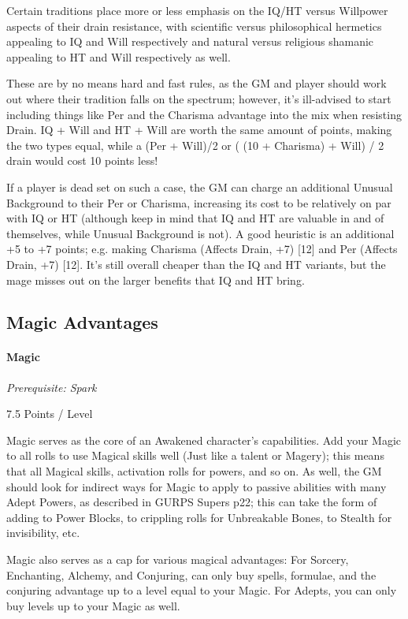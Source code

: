 \begin{multicols*}{3}
	Certain traditions place more or less emphasis on the IQ/HT versus Willpower aspects of their drain resistance, with scientific versus philosophical hermetics appealing to IQ and Will respectively and natural versus religious shamanic appealing to HT and Will respectively as well.
	
	These are by no means hard and fast rules, as the GM and player should work out where their tradition falls on the spectrum; however, it's ill-advised to start including things like Per and the Charisma advantage into the mix when resisting Drain. IQ + Will and HT + Will are worth the same amount of points, making the two types equal, while a (Per + Will)/2 or ( (10 + Charisma) + Will) / 2 drain would cost 10 points less! 
	
	If a player is dead set on such a case, the GM can charge an additional Unusual Background to their Per or Charisma, increasing its cost to be relatively on par with IQ or HT (although keep in mind that IQ and HT are valuable in and of themselves, while Unusual Background is not). A good heuristic is an additional +5 to +7 points; e.g. making Charisma (Affects Drain, +7) [12] and Per (Affects Drain, +7) [12]. It's still overall cheaper than the IQ and HT variants, but the mage misses out on the larger benefits that IQ and HT bring.
	
	\subsection{Magic Advantages}
	
	\paragraph{Magic}\label{magic}
	\textit{Prerequisite: Spark}
	\begin{flushright}
		7.5 Points / Level
	\end{flushright}
	
	Magic serves as the core of an Awakened character's capabilities. Add your Magic to all rolls to use Magical skills well (Just like a talent or Magery); this means that all Magical skills, activation rolls for powers, and so on. As well, the GM should look for indirect ways for Magic to apply to passive abilities with many Adept Powers, as described in GURPS Supers p22; this can take the form of adding to Power Blocks, to crippling rolls for Unbreakable Bones, to Stealth for invisibility, etc. 
	
	Magic also serves as a cap for various magical advantages: For Sorcery, Enchanting, Alchemy, and Conjuring, can only buy spells, formulae, and the conjuring advantage up to a level equal to your Magic. For Adepts, you can only buy levels up to your Magic as well.
	

\end{multicols*}
